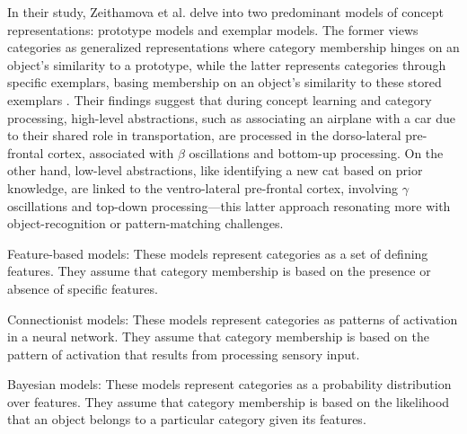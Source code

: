 In their study, Zeithamova et al. delve into two predominant models of concept representations: \gls{prototype models} and \gls{exemplar models}. The former views categories as generalized representations where category membership hinges on an object's similarity to a prototype, while the latter represents categories through specific exemplars, basing membership on an object's similarity to these stored exemplars \cite{zeithamova_brain_2019}. Their findings suggest that during concept learning and category processing, high-level abstractions, such as associating an airplane with a car due to their shared role in transportation, are processed in the dorso-lateral pre-frontal cortex, associated with $\beta$ oscillations and bottom-up processing. On the other hand, low-level abstractions, like identifying a new cat based on prior knowledge, are linked to the ventro-lateral pre-frontal cortex, involving $\gamma$ oscillations and top-down processing—this latter approach resonating more with object-recognition or pattern-matching challenges.


Feature-based models: These models represent categories as a set of defining features. They assume that category membership is based on the presence or absence of specific features.

Connectionist models: These models represent categories as patterns of activation in a neural network. They assume that category membership is based on the pattern of activation that results from processing sensory input.

Bayesian models: These models represent categories as a probability distribution over features. They assume that category membership is based on the likelihood that an object belongs to a particular category given its features.

